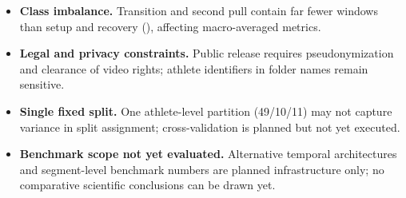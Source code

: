 \begin{itemize}
  \item \textbf{Class imbalance.}
        Transition and second pull contain far fewer windows than setup and recovery (), affecting macro-averaged metrics.

  \item \textbf{Legal and privacy constraints.}
        Public release requires pseudonymization and clearance of video rights; athlete identifiers in folder names remain sensitive.

  \item \textbf{Single fixed split.}
        One athlete-level partition (49/10/11) may not capture variance in split assignment; cross-validation is planned but not yet executed.

  \item \textbf{Benchmark scope not yet evaluated.}
        Alternative temporal architectures and segment-level benchmark numbers are planned infrastructure only; no comparative scientific conclusions can be drawn yet.
\end{itemize}
